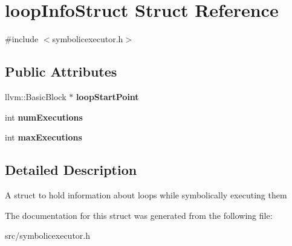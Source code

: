 \hypertarget{structloopInfoStruct}{}\section{loop\+Info\+Struct Struct Reference}
\label{structloopInfoStruct}


{\ttfamily \#include $<$symbolicexecutor.\+h$>$}

\subsection*{Public Attributes}
\begin{DoxyCompactItemize}
\item 
llvm\+::\+Basic\+Block $\ast$ {\bfseries loop\+Start\+Point}\hypertarget{structloopInfoStruct_ad5898f5fdd2ea87350de0dfe84b1ef5e}{}\label{structloopInfoStruct_ad5898f5fdd2ea87350de0dfe84b1ef5e}

\item 
int {\bfseries num\+Executions}\hypertarget{structloopInfoStruct_a8b26cf4cb59b6c7263e08346a93a145b}{}\label{structloopInfoStruct_a8b26cf4cb59b6c7263e08346a93a145b}

\item 
int {\bfseries max\+Executions}\hypertarget{structloopInfoStruct_af7700b47658dd5d12568a6480606fb47}{}\label{structloopInfoStruct_af7700b47658dd5d12568a6480606fb47}

\end{DoxyCompactItemize}


\subsection{Detailed Description}
A struct to hold information about loops while symbolically executing them 

The documentation for this struct was generated from the following file\+:\begin{DoxyCompactItemize}
\item 
src/symbolicexecutor.\+h\end{DoxyCompactItemize}
